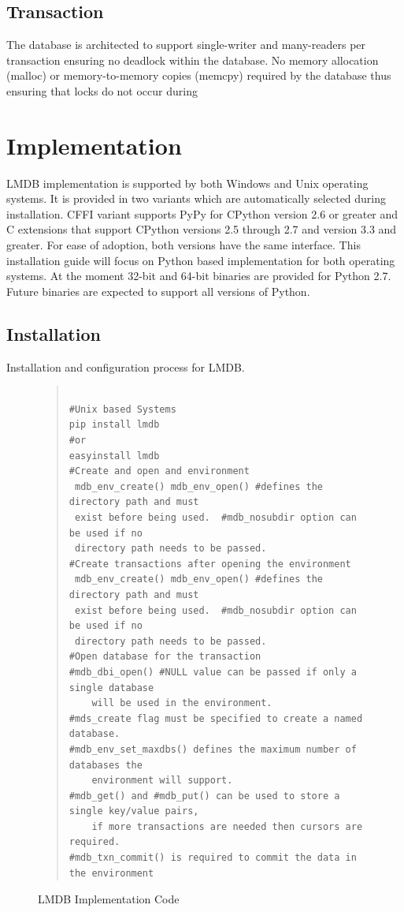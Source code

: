 \documentclass[9pt,twocolumn,twoside]{styles/osajnl}
\begin{document}
\subsection{Transaction}

The database is architected to support single-writer and many-readers
per transaction \cite{www-lmdbdoc} ensuring no deadlock within the
database. No memory allocation (malloc) or memory-to-memory copies
(memcpy) required by the database thus ensuring that locks do not
occur during

\section{Implementation}

LMDB implementation is supported by both Windows and Unix operating
systems. It is provided in two variants which are automatically
selected during installation. CFFI variant supports PyPy for CPython
version 2.6 or greater and C extensions that support CPython versions
2.5 through 2.7 and version 3.3 and greater. For ease of adoption,
both versions have the same interface. This installation guide will
focus on Python based implementation for both operating systems.  At
the moment 32-bit and 64-bit binaries are provided for Python
2.7. Future binaries are expected to support all versions of Python.

\subsection{Installation}

Installation and configuration process for LMDB.

\begin{figure}[htb]
\begin{quote}
\begin{Verbatim}

#Unix based Systems
pip install lmdb
#or
easyinstall lmdb
#Create and open and environment   
 mdb_env_create() mdb_env_open() #defines the directory path and must
 exist before being used.  #mdb_nosubdir option can be used if no
 directory path needs to be passed. 
#Create transactions after opening the environment
 mdb_env_create() mdb_env_open() #defines the directory path and must
 exist before being used.  #mdb_nosubdir option can be used if no
 directory path needs to be passed. 
#Open database for the transaction
#mdb_dbi_open() #NULL value can be passed if only a single database
    will be used in the environment. 
#mds_create flag must be specified to create a named database. 
#mdb_env_set_maxdbs() defines the maximum number of databases the
    environment will support.
#mdb_get() and #mdb_put() can be used to store a single key/value pairs,
    if more transactions are needed then cursors are required. 
#mdb_txn_commit() is required to commit the data in the environment

\end{Verbatim}
\end{quote}
\caption{LMDB Implementation Code}\label{alg:python}
\end{figure}
\end{document}

